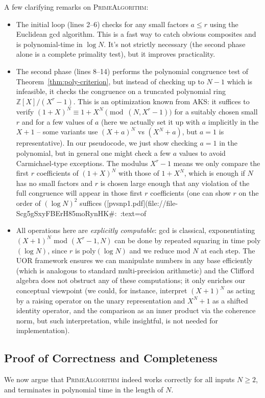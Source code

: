 \documentclass[11pt]{article}
\begin{document}
{A few clarifying remarks on \textsc{PrimeAlgorithm}:
\begin{itemize}
    \item The initial loop (lines 2–6) checks for any small factors $a \le r$ using the Euclidean gcd algorithm. This is a fast way to catch obvious composites and is polynomial-time in $\log N$. It’s not strictly necessary (the second phase alone is a complete primality test), but it improves practicality.
    \item The second phase (lines 8–14) performs the polynomial congruence test of Theorem~\ref{thm:poly-criterion}, but instead of checking up to $N-1$ which is infeasible, it checks the congruence on a truncated polynomial ring $\mathbb{Z}[X]/(X^r - 1)$. This is an optimization known from AKS: it suffices to verify $(1+X)^N \equiv 1+X^N \pmod{(N, X^r-1)}$ for a suitably chosen small $r$ and for a few values of $a$ (here we actually set it up with $a$ implicitly in the $X+1$ – some variants use $(X+a)^N$ vs $(X^N + a)$, but $a=1$ is representative). In our pseudocode, we just show checking $a=1$ in the polynomial, but in general one might check a few $a$ values to avoid Carmichael-type exceptions. The modulus $X^r-1$ means we only compare the first $r$ coefficients of $(1+X)^N$ with those of $1+X^N$, which is enough if $N$ has no small factors and $r$ is chosen large enough that any violation of the full congruence will appear in those first $r$ coefficients (one can show $r$ on the order of $(\log N)^2$ suffices ([pvsnp1.pdf](file://file-Scg5gSxyFBErH85moRynHK#:~:text=of%
    \item All operations here are \emph{explicitly computable}: gcd is classical, exponentiating $(X+1)^N$ mod $(X^r-1, N)$ can be done by repeated squaring in time poly$(\log N)$, since $r$ is poly$(\log N)$ and we reduce mod $N$ at each step. The UOR framework ensures we can manipulate numbers in any base efficiently (which is analogous to standard multi-precision arithmetic) and the Clifford algebra does not obstruct any of these computations; it only enriches our conceptual viewpoint (we could, for instance, interpret $(X+1)^N$ as acting by a raising operator on the unary representation and $X^N+1$ as a shifted identity operator, and the comparison as an inner product via the coherence norm, but such interpretation, while insightful, is not needed for implementation).
\end{itemize}

\subsection{Proof of Correctness and Completeness}
We now argue that \textsc{PrimeAlgorithm} indeed works correctly for all inputs $N\ge2$, and terminates in polynomial time in the length of $N$.

}
\end{document}
